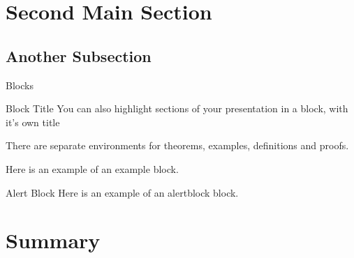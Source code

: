 \documentclass{beamer}
\begin{document}
\section{Second Main Section}

\subsection{Another Subsection}

\begin{frame}{Blocks}
    \begin{block}{Block Title}
        You can also highlight sections of your presentation in a block, with it's own title
    \end{block}
    \begin{theorem}
        There are separate environments for theorems, examples, definitions and proofs.
    \end{theorem}
    \begin{example}
        Here is an example of an example block.
    \end{example}
    \begin{alertblock}{Alert Block}
        Here is an example of an alertblock block.
    \end{alertblock}
\end{frame}

\section*{Summary}
\end{document}
